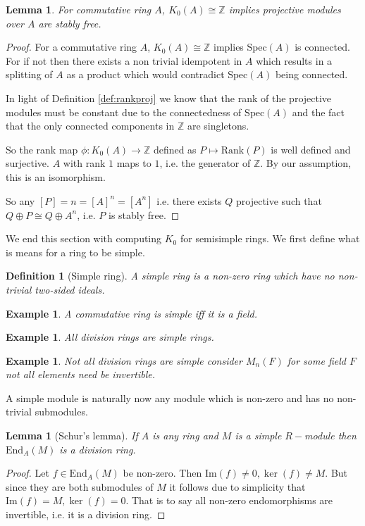 \documentclass[12pt]{report}
\numberwithin{equation}{section}
\newcommand{\Z}{\mathbb{Z}}
\newcommand{\image}{{\mathrm{Im}}}
\newcounter{dummy} \numberwithin{dummy}{section}
\newtheorem{definition}[dummy]{Definition}
\newtheorem{lemma}[dummy]{Lemma}
\newtheorem{example}[dummy]{Example}
\begin{document}
	\begin{lemma} For commutative ring $A$, 
		$K_0(A) \cong \Z $ implies projective modules over $A$ are stably free.
	\end{lemma}
	\begin{proof}
		For a commutative ring $A$, $K_0(A) \cong \Z $ implies $ \mathrm{Spec}(A)$ is connected. For if not then there exists a non trivial idempotent in $A$ which results in a splitting of $A$ as a product which would contradict $\mathrm{Spec}(A)$ being connected.
		
		In light of Definition \ref{def:rankproj} we know that the rank of the projective modules must be constant due to the connectedness of $\mathrm{Spec}(A)$ and the fact that the only connected components in $\Z $ are singletons. 
		
		So the rank map $\phi:K_0(A) \to \Z $ defined as $P \mapsto \mathrm{Rank}(P)$ is well defined and surjective. $A$ with rank $1$ maps to $1$, i.e. the generator of $\Z$. By our assumption, this is an isomorphism.				
		
		So any $[P]=n=[A]^n=[A^n]$ i.e. there exists $Q$ projective such that $Q\oplus P \cong Q \oplus A^n$, i.e. $P$ is stably free.
	\end{proof}
	
	We end this section with computing $K_0$ for semisimple rings. We first define what is means for a ring to be simple.
	
	\begin{definition}[Simple ring]
		A simple ring is a non-zero ring which have no non-trivial two-sided ideals.
	\end{definition}
	\begin{example}
		A commutative ring is simple iff it is a field.
	\end{example}
	\begin{example}
		All division rings are simple rings.
	\end{example}
	\begin{example}
		Not all division rings are simple consider $M_n(F)$ for some field $F$ not all elements need be invertible.
	\end{example}
	
	A simple module is naturally now any module which is non-zero and has no non-trivial submodules.
	
	\begin{lemma}[Schur's lemma]\label{schurs}
		If $A$ is any ring and $M$ is a simple $R-$module then $\mathrm{End}_A(M)$ is a division ring.
	\end{lemma}
	\begin{proof}
		Let $f \in \mathrm{End}_A(M)$ be non-zero. Then $\image (f) \neq 0, \ker (f) \neq M.$ But since they are both submodules of $M$ it follows due to simplicity that $\image (f)=M, \ker (f)=0$. That is to say all non-zero endomorphisms are invertible, i.e. it is a division ring.
	\end{proof}
	
\end{document}
